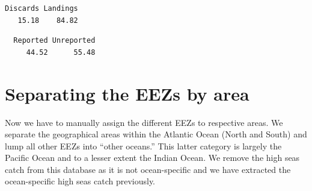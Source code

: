 \documentclass[
  letterpaper,
  oneside,
  open=any]{scrbook}
\newenvironment{Shaded}{\begin{snugshade}}{\end{snugshade}}
\newcommand{\AttributeTok}[1]{\textcolor[rgb]{0.40,0.45,0.13}{#1}}
\newcommand{\CommentTok}[1]{\textcolor[rgb]{0.37,0.37,0.37}{#1}}
\newcommand{\DecValTok}[1]{\textcolor[rgb]{0.68,0.00,0.00}{#1}}
\newcommand{\FunctionTok}[1]{\textcolor[rgb]{0.28,0.35,0.67}{#1}}
\newcommand{\NormalTok}[1]{\textcolor[rgb]{0.00,0.23,0.31}{#1}}
\newcommand{\SpecialCharTok}[1]{\textcolor[rgb]{0.37,0.37,0.37}{#1}}
\begin{document}
\begin{Shaded}
\end{Shaded}

\begin{verbatim}
Discards Landings 
   15.18    84.82 
\end{verbatim}

\begin{Shaded}
\end{Shaded}

\begin{verbatim}
  Reported Unreported 
     44.52      55.48 
\end{verbatim}

\section{Separating the EEZs by area}\label{separating-the-eezs-by-area}

Now we have to manually assign the different EEZs to respective areas.
We separate the geographical areas within the Atlantic Ocean (North and
South) and lump all other EEZs into ``other oceans.'' This latter
category is largely the Pacific Ocean and to a lesser extent the Indian
Ocean. We remove the high seas catch from this database as it is not
ocean-specific and we have extracted the ocean-specific high seas catch
previously.
\end{document}
